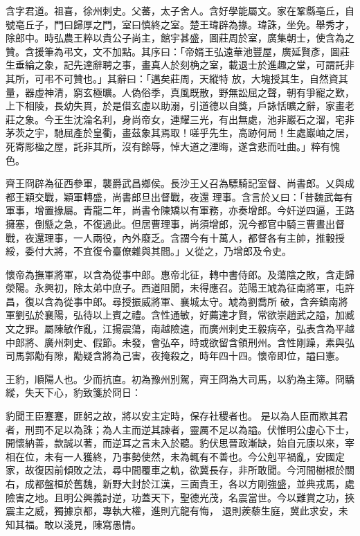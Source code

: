 \begin{pinyinscope}
 含字君道。祖喜，徐州刺史。父蕃，太子舍人。含好學能屬文。家在鞏縣亳丘，自號亳丘子，門曰歸厚之門，室曰慎終之室。楚王瑋辟為掾。瑋誅，坐免。舉秀才，除郎中。時弘農王粹以貴公子尚主，館宇甚盛，圖莊周於室，廣集朝士，使含為之贊。含援筆為弔文，文不加點。其序曰：「帝婿王弘遠華池豐屋，廣延賢彥，圖莊生垂綸之象，記先達辭聘之事，畫真人於刻桷之室，載退士於進趣之堂，可謂託非其所，可弔不可贊也。」其辭曰：「邁矣莊周，天縱特
 放，大塊授其生，自然資其量，器虛神清，窮玄極曠。人偽俗季，真風既散，野無訟屈之聲，朝有爭寵之歎，上下相陵，長幼失貫，於是借玄虛以助溺，引道德以自獎，戶詠恬曠之辭，家畫老莊之象。今王生沈淪名利，身尚帝女，連耀三光，有出無處，池非巖石之溜，宅非茅茨之宇，馳屈產於皇衢，畫茲象其焉取！嗟乎先生，高跡何局！生處巖岫之居，死寄彫楹之屋，託非其所，沒有餘辱，悼大道之湮晦，遂含悲而吐曲。」粹有愧色。



 齊王冏辟為征西參軍，襲爵武昌鄉侯。長沙王乂召為驃騎記室督、尚書郎。乂與成都王穎交戰，穎軍轉盛，尚書郎旦出督戰，夜還
 理事。含言於乂曰：「昔魏武每有軍事，增置掾屬。青龍二年，尚書令陳矯以有軍務，亦奏增郎。今奸逆四逼，王路擁塞，倒懸之急，不復過此。但居曹理事，尚須增郎，況今都官中騎三曹晝出督戰，夜還理事，一人兩役，內外廢乏。含謂今有十萬人，都督各有主帥，推轂授綏，委付大將，不宜復令臺僚雜與其間。」乂從之，乃增郎及令史。



 懷帝為撫軍將軍，以含為從事中郎。惠帝北征，轉中書侍郎。及蕩陰之敗，含走歸滎陽。永興初，除太弟中庶子。西道阻閡，未得應召。范陽王虓為征南將軍，屯許昌，復以含為從事中郎。尋授振威將軍、襄城太守。虓為劉喬所
 破，含奔鎮南將軍劉弘於襄陽，弘待以上賓之禮。含性通敏，好薦達才賢，常欲崇趙武之謚，加臧文之罪。屬陳敏作亂，江揚震蕩，南越險遠，而廣州刺史王毅病卒，弘表含為平越中郎將、廣州刺史、假節。未發，會弘卒，時或欲留含領刑州。含性剛躁，素與弘司馬郭勱有隙，勱疑含將為己害，夜掩殺之，時年四十四。懷帝即位，謚曰憲。



 王豹，順陽人也。少而抗直。初為豫州別駕，齊王冏為大司馬，以豹為主簿。冏驕縱，失天下心，豹致箋於冏日：



 豹聞王臣蹇蹇，匪躬之故，將以安主定時，保存社稷者也。
 是以為人臣而欺其君者，刑罰不足以為誅；為人主而逆其諫者，靈厲不足以為謚。伏惟明公虛心下士，開懷納善，款誠以著，而逆耳之言未入於聽。豹伏思晉政漸缺，始自元康以來，宰相在位，未有一人獲終，乃事勢使然，未為輒有不善也。今公剋平禍亂，安國定家，故復因前傾敗之法，尋中間覆車之軌，欲冀長存，非所敢聞。今河間樹根於關右，成都盤桓於舊魏，新野大封於江漢，三面貴王，各以方剛強盛，並典戎馬，處險害之地。且明公興義討逆，功蓋天下，聖德光茂，名震當世。今以難賞之功，挾震主之威，獨據京都，專執大權，進則亢龍有悔，
 退則蒺藜生庭，冀此求安，未知其福。敢以淺見，陳寫愚情。




\end{pinyinscope}
